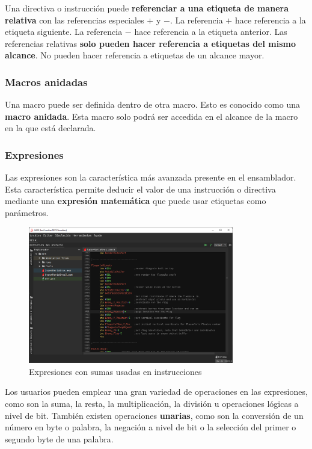Una directiva o instrucción puede \textbf{referenciar a una etiqueta de manera
relativa} con las referencias especiales $+$ y $-$.
La referencia $+$ hace referencia a la etiqueta siguiente.
La referencia $-$ hace referencia a la etiqueta anterior.
Las referencias relativas \textbf{solo pueden hacer referencia
a etiquetas del mismo alcance}.
No pueden hacer referencia a etiquetas de un alcance mayor.

\subsubsection{Macros anidadas}\label{subsubsec:macros-anidadas}

Una macro puede ser definida dentro de otra macro.
Esto es conocido como una \textbf{macro anidada}.
Esta macro solo podrá ser accedida en el alcance de la macro
en la que está declarada.

\subsubsection{Expresiones}\label{subsubsec:expresiones}

Las expresiones son la característica más avanzada
presente en el ensamblador.
Esta característica permite deducir el valor
de una instrucción o directiva mediante una \textbf{expresión matemática}
que puede usar etiquetas como parámetros.

\begin{figure}[h]
    \centering
    \includegraphics[width=0.8\textwidth]{images/nes/nes-expressions}
    \caption{Expresiones con sumas usadas en instrucciones}
    \label{fig:nes-expressions}
\end{figure}

Los usuarios pueden emplear una gran variedad de operaciones
en las expresiones, como son la suma, la resta, la multiplicación,
la división u operaciones lógicas a nivel de bit.
También existen operaciones \textbf{unarias}, como son
la conversión de un número en byte o palabra,
la negación a nivel de bit o la selección del
primer o segundo byte de una palabra.

